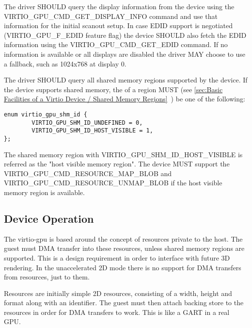 
The driver SHOULD query the display information from the device using
the VIRTIO_GPU_CMD_GET_DISPLAY_INFO command and use that information
for the initial scanout setup.  In case EDID support is negotiated
(VIRTIO_GPU_F_EDID feature flag) the device SHOULD also fetch the EDID
information using the VIRTIO_GPU_CMD_GET_EDID command.  If no
information is available or all displays are disabled the driver MAY
choose to use a fallback, such as 1024x768 at display 0.

The driver SHOULD query all shared memory regions supported by the device.
If the device supports shared memory, the  of a region MUST
(see \ref{sec:Basic Facilities of a Virtio Device /
Shared Memory Regions}~) be one of the following:

\begin{lstlisting}
enum virtio_gpu_shm_id {
        VIRTIO_GPU_SHM_ID_UNDEFINED = 0,
        VIRTIO_GPU_SHM_ID_HOST_VISIBLE = 1,
};
\end{lstlisting}

The shared memory region with VIRTIO_GPU_SHM_ID_HOST_VISIBLE is referred as
the "host visible memory region".  The device MUST support the
VIRTIO_GPU_CMD_RESOURCE_MAP_BLOB and VIRTIO_GPU_CMD_RESOURCE_UNMAP_BLOB
if the host visible memory region is available.

\subsection{Device Operation}\label{sec:Device Types / GPU Device / Device Operation}

The virtio-gpu is based around the concept of resources private to the
host.  The guest must DMA transfer into these resources, unless shared memory
regions are supported. This is a design requirement in order to interface with
future 3D rendering. In the unaccelerated 2D mode there is no support for DMA
transfers from resources, just to them.

Resources are initially simple 2D resources, consisting of a width,
height and format along with an identifier. The guest must then attach
backing store to the resources in order for DMA transfers to
work. This is like a GART in a real GPU.

